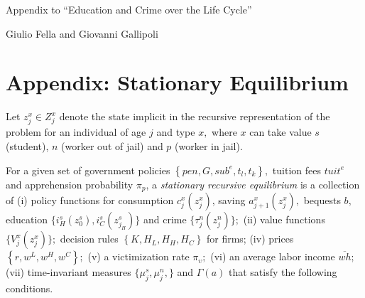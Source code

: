 \documentclass[a4paper,dvips,12pt]{article}
\begin{document}
\begin{center}
{\Large
Appendix to ``Education and Crime over the Life Cycle''}
\bigskip

Giulio Fella and Giovanni Gallipoli
\end{center}
\setcounter{section}{0}
\setcounter{page}{1}
\setcounter{equation}{0}
\setcounter{figure}{0}
\setcounter{table}{0}
\bigskip

\section{Appendix: Stationary Equilibrium}
\label{sec:stat-equil}

Let $z_{j}^{x}\in Z^{x}_{j}$ denote the state implicit in the recursive
representation of the problem for an individual of age $j$ and type $x,$
where $x$ can take value $s$ (student), $n$ (worker out of jail) and $p$
(worker in jail).

For a given set of government policies $\left\{pen,G,sub^{e},t_{l},t_{k}%
\right\}, $ tuition fees $tuit^e$ and apprehension probability $\pi_{p}$, a \emph{%
  stationary recursive equilibrium} is a collection of (i) policy functions
for consumption $c^{x}_{j}(z^{x}_{j})$, saving $%
a^{x}_{j+1} (z^{x}_{j}),$ bequests $b,$ education $%
\{i^{s}_{H}(z^{s}_{0}),i^{s}_{C}(z^{s}_{j_H})\}$ and crime $%
\{\tau^{n}_{j}(z^n_j)\};$ (ii) value functions $\{V^{x}_{j}(z^{x}_{j})\};$
decision rules \linebreak $\left\{ K,H_{L},H_{H},H_{C}\right\} $ for firms; (iv) prices
$\left\{ r,w^{L},w^{H},w^{C}\right\}; $ (v) a victimization rate $%
\pi_{\upsilon};$ (vi) an average labor income $\overline{wh};$ (vii)
time-invariant measures $\{\mu^{s}_{j},\mu^{n}_{j},\}$ and $\Gamma(a)$ that
satisfy the following conditions.
\end{document}
